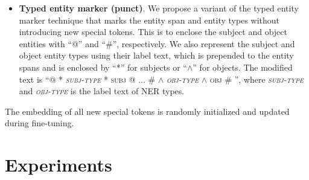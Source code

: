 \documentclass[11pt,a4paper]{article}
\begin{document}
\begin{itemize}[leftmargin=1em]
    \item \textbf{Typed entity marker (punct)}. We propose a variant of the typed entity marker technique that marks the entity span and entity types without introducing new special tokens.
    This is to enclose the subject and object entities with ``@'' and ``\#'', respectively.
    We also represent the subject and object entity types using their label text, which is prepended to the entity spans and is enclosed by ``*'' for subjects or ``$\wedge$'' for objects.
    The modified text is ``@ * \textsc{\textit{subj-type}} * \textsc{subj} @ ... \# $\wedge$ \textsc{\textit{obj-type}} $\wedge$ \textsc{obj} \# '', where \textsc{\textit{subj-type}} and \textsc{\textit{obj-type}} is the label text of NER types.
\end{itemize}

The embedding of all new special tokens is randomly initialized and updated during fine-tuning.

\section{Experiments}

\begin{table*}[!t]
\centering
{}
    \caption{Test $\bm{F_1}$ (in \%) of different entity representation techniques on TACRED. For each technique, we also provide the processed input of an example text \textit{``Bill was born in Seattle''}. Typed entity markers (original and punct) significantly outperforms others.}
    \label{tab::representation}
\end{table*}
\end{document}
